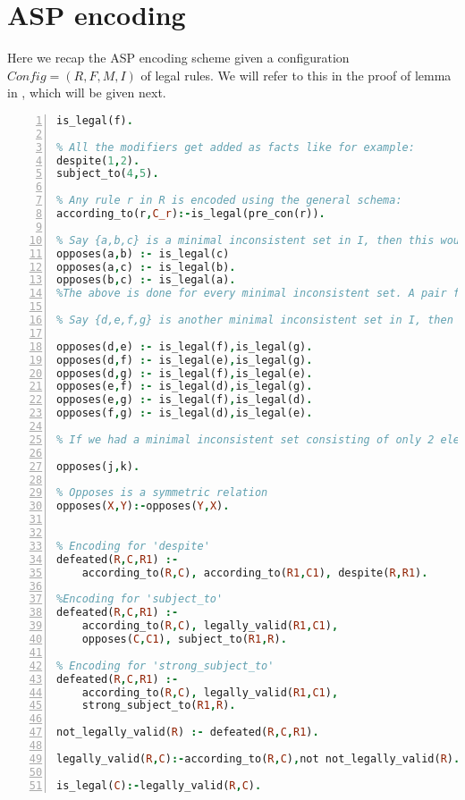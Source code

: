 \section{ASP encoding}
Here we recap the ASP encoding scheme given a configuration $Config =
(R,F,M,I)$ of legal rules. We will refer to this in the proof of lemma in \secref{},
which will be given next. 
\begin{lstlisting}[language=Prolog, numbers=left]
% For any f in F, we have:
is_legal(f). 

% All the modifiers get added as facts like for example:
despite(1,2).
subject_to(4,5).

% Any rule r in R is encoded using the general schema:
according_to(r,C_r):-is_legal(pre_con(r)).

% Say {a,b,c} is a minimal inconsistent set in I, then this would get encoded as: 
opposes(a,b) :- is_legal(c)
opposes(a,c) :- is_legal(b).
opposes(b,c) :- is_legal(a).
%The above is done for every minimal inconsistent set. A pair from the set forms the opposes predicate and the rest of the elements go in the body 

% Say {d,e,f,g} is another minimal inconsistent set in I, then this would get encoded as:

opposes(d,e) :- is_legal(f),is_legal(g).
opposes(d,f) :- is_legal(e),is_legal(g).
opposes(d,g) :- is_legal(f),is_legal(e).
opposes(e,f) :- is_legal(d),is_legal(g).
opposes(e,g) :- is_legal(f),is_legal(d).
opposes(f,g) :- is_legal(d),is_legal(e).

% If we had a minimal inconsistent set consisting of only 2 elements say {j,k}, this would get encoded as:

opposes(j,k).

% Opposes is a symmetric relation
opposes(X,Y):-opposes(Y,X).


% Encoding for 'despite'
defeated(R,C,R1) :-
    according_to(R,C), according_to(R1,C1), despite(R,R1).

%Encoding for 'subject_to'
defeated(R,C,R1) :-
    according_to(R,C), legally_valid(R1,C1),
    opposes(C,C1), subject_to(R1,R).

% Encoding for 'strong_subject_to'
defeated(R,C,R1) :-
    according_to(R,C), legally_valid(R1,C1),
    strong_subject_to(R1,R).

not_legally_valid(R) :- defeated(R,C,R1).

legally_valid(R,C):-according_to(R,C),not not_legally_valid(R).

is_legal(C):-legally_valid(R,C).
\end{lstlisting}




